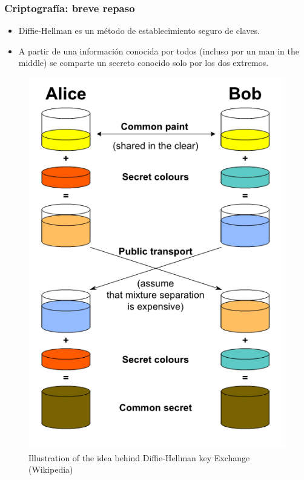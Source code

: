 \documentclass[spanish, a4paper, 12pt, final, slideColor, nototal, colorBG, pdf, noaccumulate, darkblue] {beamer}
\begin{document}
\begin{frame}
    \frametitle{Criptografía: breve repaso}
    \begin{itemize}
    \item Diffie-Hellman es un método de establecimiento seguro de claves.
    \item A partir de una información conocida por todos (incluso por un man in the middle) se comparte un secreto conocido solo por los dos extremos.
    \end{itemize}
    \begin{figure}[!ht]
      \centering
      \includegraphics[scale=0.25]{Diffie-Hellman-Wikipedia.png}
      \caption{Illustration of the idea behind Diffie-Hellman key Exchange (Wikipedia)}
    \end{figure}
\end{frame}
\end{document}
